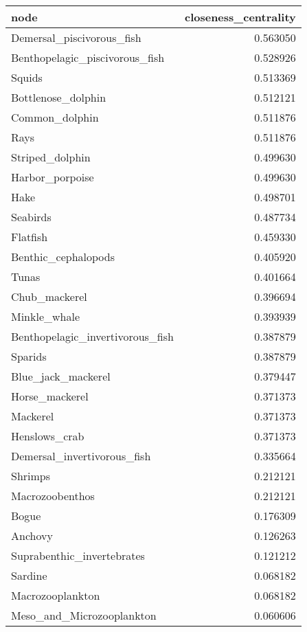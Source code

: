 \begin{tabular}{lr}
\toprule
                            node &  closeness\_centrality \\
\midrule
       Demersal\_piscivorous\_fish &              0.563050 \\
  Benthopelagic\_piscivorous\_fish &              0.528926 \\
                          Squids &              0.513369 \\
              Bottlenose\_dolphin &              0.512121 \\
                  Common\_dolphin &              0.511876 \\
                            Rays &              0.511876 \\
                 Striped\_dolphin &              0.499630 \\
                 Harbor\_porpoise &              0.499630 \\
                            Hake &              0.498701 \\
                        Seabirds &              0.487734 \\
                        Flatfish &              0.459330 \\
             Benthic\_cephalopods &              0.405920 \\
                           Tunas &              0.401664 \\
                   Chub\_mackerel &              0.396694 \\
                    Minkle\_whale &              0.393939 \\
Benthopelagic\_invertivorous\_fish &              0.387879 \\
                         Sparids &              0.387879 \\
              Blue\_jack\_mackerel &              0.379447 \\
                  Horse\_mackerel &              0.371373 \\
                        Mackerel &              0.371373 \\
                   Henslows\_crab &              0.371373 \\
     Demersal\_invertivorous\_fish &              0.335664 \\
                         Shrimps &              0.212121 \\
                 Macrozoobenthos &              0.212121 \\
                           Bogue &              0.176309 \\
                         Anchovy &              0.126263 \\
      Suprabenthic\_invertebrates &              0.121212 \\
                         Sardine &              0.068182 \\
                Macrozooplankton &              0.068182 \\
       Meso\_and\_Microzooplankton &              0.060606 \\
\bottomrule
\end{tabular}
